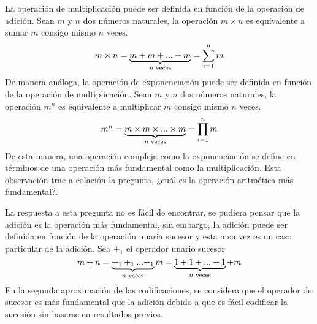 La operación de multiplicación puede ser definida en función de la operación de adición. Sean \( m \) y \( n \) dos números naturales, la operación \( m \times n \) es equivalente a sumar \( m \) consigo mismo \( n \) veces.
\begin{equation}
  \label{eq:numeral:muldef}
  m \times n = \underbrace{m + m + ... + m}_\text{\( n \) veces} = \sum_{i=1}^{n} m
\end{equation}
De manera análoga, la operación de exponenciación puede ser definida en función de la operación de multiplicación. Sean \( m \) y \( n \) dos números naturales, la operación \( m^{n} \) es equivalente a multiplicar \( m \) consigo mismo \( n \) veces.
\begin{equation}
  \label{eq:numeral:expdef}
  m^{n} = \underbrace{m \times m \times ... \times m}_\text{\( n \) veces} = \prod_{i=1}^{n} m
\end{equation}
De esta manera, una operación compleja como la exponenciación se define en términos de una operación más fundamental como la multiplicación. Esta observación trae a colación la pregunta, ¿cuál es la operación aritmética más fundamental?.

La respuesta a esta pregunta no es fácil de encontrar, se pudiera pensar que la adición es la operación más fundamental, sin embargo, la adición puede ser definida en función de la operación unaria sucesor y esta a su vez es un caso particular de la adición. Sea \( +_{1} \) el operador unario sucesor
\[ m + n = \underbrace{+_{1} +_{1} ... {} +_{1}}_\text{\( n \) veces} m = \underbrace{1 + 1 + ... + 1}_\text{\( n \) veces}+m \]
En la segunda aproximación de las codificaciones, se considera que el operador de sucesor es más fundamental que la adición debido a que es fácil codificar la sucesión sin basarse en resultados previos.

